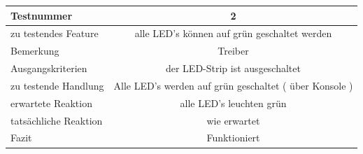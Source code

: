 \documentclass[]{article}
\begin{document}
\begin{longtable}[]{@{}lc@{}}
\toprule
\begin{minipage}[b]{0.25\columnwidth}\raggedright\strut
Testnummer\strut
\end{minipage} & \begin{minipage}[b]{0.55\columnwidth}\centering\strut
2\strut
\end{minipage}\tabularnewline
\midrule
\endhead
\begin{minipage}[t]{0.25\columnwidth}\raggedright\strut
zu testendes Feature\strut
\end{minipage} & \begin{minipage}[t]{0.55\columnwidth}\centering\strut
alle LED's können auf grün geschaltet werden\strut
\end{minipage}\tabularnewline
\begin{minipage}[t]{0.25\columnwidth}\raggedright\strut
Bemerkung\strut
\end{minipage} & \begin{minipage}[t]{0.55\columnwidth}\centering\strut
Treiber\strut
\end{minipage}\tabularnewline
\begin{minipage}[t]{0.25\columnwidth}\raggedright\strut
Ausgangskriterien\strut
\end{minipage} & \begin{minipage}[t]{0.55\columnwidth}\centering\strut
der LED-Strip ist ausgeschaltet\strut
\end{minipage}\tabularnewline
\begin{minipage}[t]{0.25\columnwidth}\raggedright\strut
zu testende Handlung\strut
\end{minipage} & \begin{minipage}[t]{0.55\columnwidth}\centering\strut
Alle LED's werden auf grün geschaltet ( über Konsole )\strut
\end{minipage}\tabularnewline
\begin{minipage}[t]{0.25\columnwidth}\raggedright\strut
erwartete Reaktion\strut
\end{minipage} & \begin{minipage}[t]{0.55\columnwidth}\centering\strut
alle LED's leuchten grün\strut
\end{minipage}\tabularnewline
\begin{minipage}[t]{0.25\columnwidth}\raggedright\strut
tatsächliche Reaktion\strut
\end{minipage} & \begin{minipage}[t]{0.55\columnwidth}\centering\strut
wie erwartet\strut
\end{minipage}\tabularnewline
\begin{minipage}[t]{0.25\columnwidth}\raggedright\strut
Fazit\strut
\end{minipage} & \begin{minipage}[t]{0.55\columnwidth}\centering\strut
Funktioniert\strut
\end{minipage}\tabularnewline
\bottomrule
\end{longtable}
\end{document}
